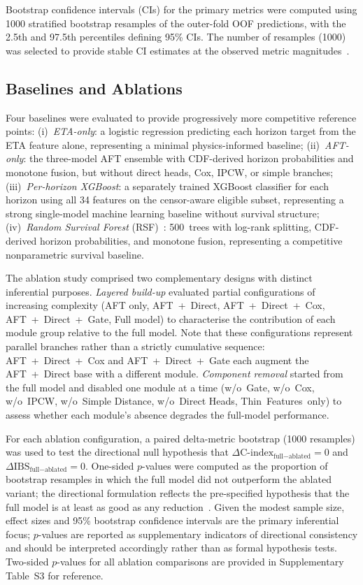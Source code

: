 \documentclass[fire,article,submit,pdftex]{../Definitions/mdpi}
\begin{document}
Bootstrap confidence intervals (CIs) for the primary metrics were computed using 1000 stratified bootstrap resamples of the outer-fold OOF predictions, with the 2.5th and 97.5th percentiles defining 95\% CIs.
The number of resamples (1000) was selected to provide stable CI estimates at the observed metric magnitudes~\cite{Efron1993}.

\subsection{Baselines and Ablations}\label{sec:baselines}

Four baselines were evaluated to provide progressively more competitive reference points:
(i)~\emph{ETA-only}: a logistic regression predicting each horizon target from the ETA feature alone, representing a minimal physics-informed baseline;
(ii)~\emph{AFT-only}: the three-model AFT ensemble with CDF-derived horizon probabilities and monotone fusion, but without direct heads, Cox, IPCW, or simple branches;
(iii)~\emph{Per-horizon XGBoost}: a separately trained XGBoost classifier for each horizon using all 34 features on the censor-aware eligible subset, representing a strong single-model machine learning baseline without survival structure;
(iv)~\emph{Random Survival Forest} (RSF)~\cite{Ishwaran2008}: 500~trees with log-rank splitting, CDF-derived horizon probabilities, and monotone fusion, representing a competitive nonparametric survival baseline.

The ablation study comprised two complementary designs with distinct inferential purposes.
\emph{Layered build-up} evaluated partial configurations of increasing complexity (AFT only, AFT~+~Direct, AFT~+~Direct~+~Cox, AFT~+~Direct~+~Gate, Full model) to characterise the contribution of each module group relative to the full model.
Note that these configurations represent parallel branches rather than a strictly cumulative sequence: AFT~+~Direct~+~Cox and AFT~+~Direct~+~Gate each augment the AFT~+~Direct base with a different module.
\emph{Component removal} started from the full model and disabled one module at a time (w/o~Gate, w/o~Cox, w/o~IPCW, w/o~Simple Distance, w/o~Direct Heads, Thin~Features~only) to assess whether each module's absence degrades the full-model performance.

For each ablation configuration, a paired delta-metric bootstrap (1000 resamples) was used to test the directional null hypothesis that $\Delta\text{C-index}_{\text{full} - \text{ablated}} = 0$ and $\Delta\text{IBS}_{\text{full} - \text{ablated}} = 0$.
One-sided $p$-values were computed as the proportion of bootstrap resamples in which the full model did not outperform the ablated variant; the directional formulation reflects the pre-specified hypothesis that the full model is at least as good as any reduction~\cite{Collins2024}.
Given the modest sample size, effect sizes and 95\% bootstrap confidence intervals are the primary inferential focus; $p$-values are reported as supplementary indicators of directional consistency and should be interpreted accordingly rather than as formal hypothesis tests.
Two-sided $p$-values for all ablation comparisons are provided in Supplementary Table~S3 for reference.
\end{document}
